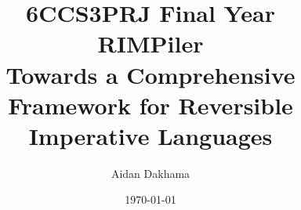 \documentclass[11pt]{informatics-report}
\title{6CCS3PRJ Final Year\\\vspace{0.2cm}RIMPiler\\\large Towards a Comprehensive Framework for Reversible \\Imperative Languages}
\author{Aidan Dakhama}
\date{\today}
\begin{document}
\createFrontMatter
\onehalfspacing
\tableofcontents
\doublespacing

\renewcommand{\bibsection}{\chapter{Bibliography}}















\appendix


\end{document}
